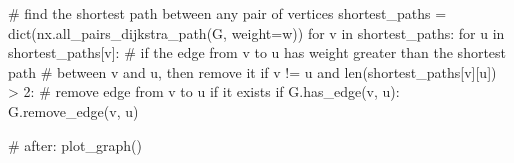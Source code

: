 \documentclass[
  letterpaper,
  DIV=11,
  numbers=noendperiod]{scrartcl}
\newenvironment{Shaded}{\begin{snugshade}}{\end{snugshade}}
\newcommand{\BuiltInTok}[1]{\textcolor[rgb]{0.00,0.23,0.31}{#1}}
\newcommand{\CommentTok}[1]{\textcolor[rgb]{0.37,0.37,0.37}{#1}}
\newcommand{\ControlFlowTok}[1]{\textcolor[rgb]{0.00,0.23,0.31}{#1}}
\newcommand{\DecValTok}[1]{\textcolor[rgb]{0.68,0.00,0.00}{#1}}
\newcommand{\KeywordTok}[1]{\textcolor[rgb]{0.00,0.23,0.31}{#1}}
\newcommand{\NormalTok}[1]{\textcolor[rgb]{0.00,0.23,0.31}{#1}}
\newcommand{\OperatorTok}[1]{\textcolor[rgb]{0.37,0.37,0.37}{#1}}
\newcommand{\StringTok}[1]{\textcolor[rgb]{0.13,0.47,0.30}{#1}}
\theoremstyle{plain}
\theoremstyle{plain}
\theoremstyle{plain}
\theoremstyle{definition}
\theoremstyle{remark}
\begin{document}
\begin{Shaded}
\begin{Highlighting}[]
\CommentTok{\# find the shortest path between any pair of vertices}
\NormalTok{shortest\_paths }\OperatorTok{=} \BuiltInTok{dict}\NormalTok{(nx.all\_pairs\_dijkstra\_path(G, weight}\OperatorTok{=}\StringTok{\textquotesingle{}w\textquotesingle{}}\NormalTok{))}
\ControlFlowTok{for}\NormalTok{ v }\KeywordTok{in}\NormalTok{ shortest\_paths:}
    \ControlFlowTok{for}\NormalTok{ u }\KeywordTok{in}\NormalTok{ shortest\_paths[v]:}
      \CommentTok{\# if the edge from v to u has weight greater than the shortest path}
      \CommentTok{\# between v and u, then remove it}
      \ControlFlowTok{if}\NormalTok{ v }\OperatorTok{!=}\NormalTok{ u }\KeywordTok{and} \BuiltInTok{len}\NormalTok{(shortest\_paths[v][u]) }\OperatorTok{\textgreater{}} \DecValTok{2}\NormalTok{:}
        \CommentTok{\# remove edge from v to u if it exists}
        \ControlFlowTok{if}\NormalTok{ G.has\_edge(v, u):}
\NormalTok{          G.remove\_edge(v, u)}

\CommentTok{\# after:}
\NormalTok{plot\_graph()}
\end{Highlighting}
\end{Shaded}
\end{document}
